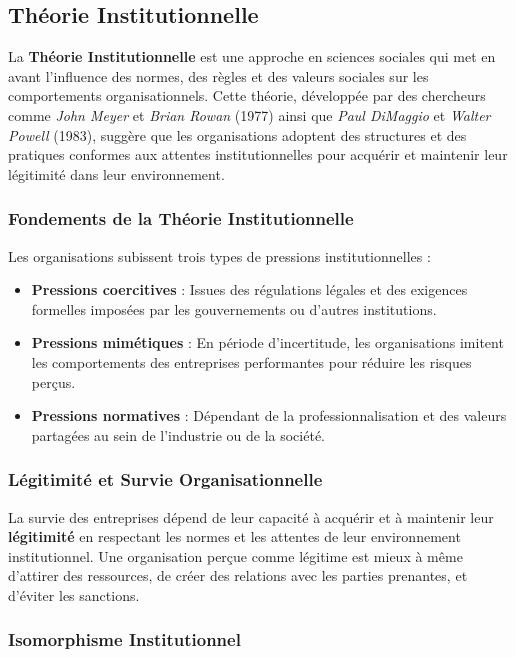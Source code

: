 \documentclass[a4paper,12pt]{report}
\begin{document}
\subsection{Théorie Institutionnelle}

La \textbf{Théorie Institutionnelle} est une approche en sciences sociales qui met en avant l'influence des normes, des règles et des valeurs sociales sur les comportements organisationnels. Cette théorie, développée par des chercheurs comme \textit{John Meyer} et \textit{Brian Rowan} (1977) ainsi que \textit{Paul DiMaggio} et \textit{Walter Powell} (1983), suggère que les organisations adoptent des structures et des pratiques conformes aux attentes institutionnelles pour acquérir et maintenir leur légitimité dans leur environnement.

\subsubsection{Fondements de la Théorie Institutionnelle}

Les organisations subissent trois types de pressions institutionnelles :
\begin{itemize}
    \item \textbf{Pressions coercitives} : Issues des régulations légales et des exigences formelles imposées par les gouvernements ou d'autres institutions.
    \item \textbf{Pressions mimétiques} : En période d'incertitude, les organisations imitent les comportements des entreprises performantes pour réduire les risques perçus.
    \item \textbf{Pressions normatives} : Dépendant de la professionnalisation et des valeurs partagées au sein de l'industrie ou de la société.
\end{itemize}

\subsubsection{Légitimité et Survie Organisationnelle}

La survie des entreprises dépend de leur capacité à acquérir et à maintenir leur \textbf{légitimité} en respectant les normes et les attentes de leur environnement institutionnel. Une organisation perçue comme légitime est mieux à même d'attirer des ressources, de créer des relations avec les parties prenantes, et d'éviter les sanctions.

\subsubsection{Isomorphisme Institutionnel}
\end{document}
